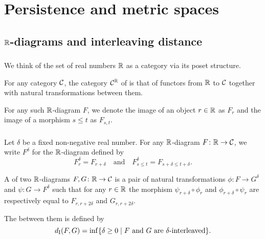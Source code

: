 
\section{Persistence and metric spaces}


\subsection{$\mathbb{R}$-diagrams and interleaving distance}

\subsubsection{}

We think of the set of real numbers $\mathbb{R}$ as a category via its poset structure.

For any category $\mathcal{C}$, the category $\mathcal{C}^{\mathbb{R}}$ of  is that of functors from $\mathbb{R}$ to $\mathcal{C}$ together with natural transformations between them.

For any such $\mathbb{R}$-diagram $F$, we denote the image of an object $r \in \mathbb{R}$ as $F_r$ and the image of a morphism $s \leq t$ as $F_{s,t}$.

\subsubsection{}\label{ss:interleaving}

Let $\delta$ be a fixed non-negative real number.
For any $\mathbb{R}$-diagram $F \colon \mathbb{R} \to \mathcal{C}$, we write $F^\delta$ for the $\mathbb{R}$-diagram defined by
\[
F^\delta_r = F_{r+\delta}
\quad\text{and}\quad
F^\delta_{s \leq t} = F_{s+\delta \leq t+\delta}.
\]

A  of two $\mathbb{R}$-diagrams $F,G \colon \mathbb{R} \to \mathcal{C}$ is a pair of natural transformations
$\phi \colon F \to G^\delta$ and $\psi \colon G \to F^\delta$ such that for any $r \in \mathbb{R}$ the morphism $\psi_{r+\delta} \circ \phi_r$ and $\phi_{r+\delta} \circ \psi_r$ are respectively equal to $F_{r,r+2\delta}$ and $G_{r,r+2\delta}$.

The  between them is defined by
\[
d_{\mathrm{I}}(F, G) = \inf\{\delta \geq 0 \mid F \text{ and } G \text{ are } \delta\text{-interleaved}\}.
\]

